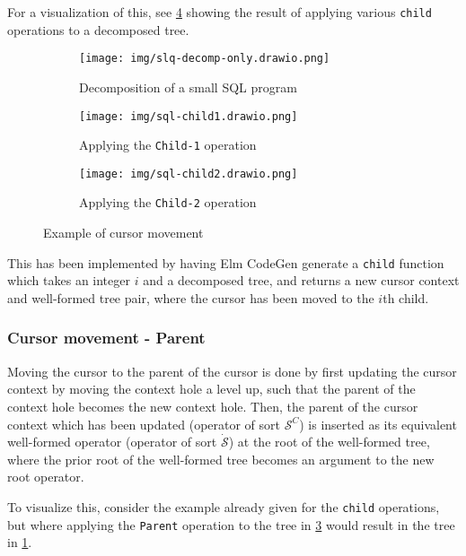 \documentclass[sigplan,review]{acmart}
\begin{document}
For a visualization of this, see \cref{fig:movement-example} showing the result
of applying various \texttt{child} operations to a decomposed tree.

\begin{figure}[H]
  \centering
  \begin{subfigure}[b]{0.9\linewidth}
    \centering
    \texttt{[image: img/slq-decomp-only.drawio.png]}
    \caption{Decomposition of a small SQL program}
    \label{subfig:decomp-only}
  \end{subfigure}
  \hfill
  \begin{subfigure}[b]{0.9\linewidth}
    \centering
    \texttt{[image: img/sql-child1.drawio.png]}
    \caption{Applying the \texttt{Child-1} operation}
    \label{subfig:child1}
  \end{subfigure}
  \hfill
  \begin{subfigure}[b]{0.9\linewidth}
    \centering
    \texttt{[image: img/sql-child2.drawio.png]}
    \caption{Applying the \texttt{Child-2} operation}
    \label{subfig:child2}
  \end{subfigure}
  \caption{Example of cursor movement}
  \label{fig:movement-example}
\end{figure}

This has been implemented by having Elm CodeGen generate a \texttt{child} function which
takes an integer $i$ and a decomposed tree, and returns a new cursor context
and well-formed tree pair, where the cursor has been moved to the $i$th child.

\subsubsection{Cursor movement - Parent}

Moving the cursor to the parent of the cursor is done by first updating the cursor context
by moving the context hole a level up, such that the parent of the context hole
becomes the new context hole. Then, the parent of the cursor context which has
been updated (operator of sort $\mathcal{S}^C$) is inserted as its equivalent
well-formed operator (operator of sort $\dot{\mathcal{S}}$) at the root of the
well-formed tree, where the prior root of the well-formed tree becomes an argument to the new root operator.

To visualize this, consider the example already given for the \texttt{child} operations, but where applying the \texttt{Parent} operation to the tree in \cref{subfig:child2} would result in the tree in \cref{subfig:decomp-only}.
\end{document}
